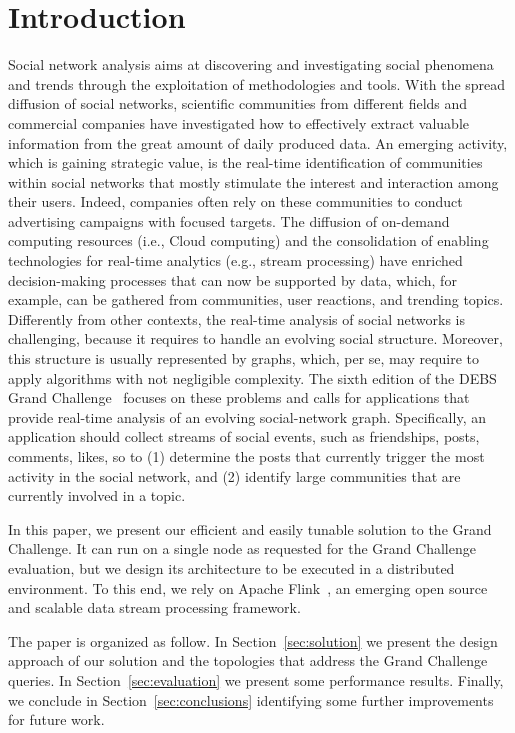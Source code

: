 \section{Introduction}
\label{sec:introduction}

Social network analysis aims at discovering and investigating social phenomena and trends through the exploitation of methodologies and tools.
With the spread diffusion of social networks, scientific communities from different fields and commercial companies have investigated how to effectively extract valuable information from the great amount of daily produced data. 
%
An emerging activity, which is gaining strategic value, is the real-time identification of communities within social networks that mostly stimulate the interest and interaction among their users. Indeed, companies often rely on these communities to conduct advertising campaigns with focused targets.
%
The diffusion of on-demand computing resources (i.e., Cloud computing) and the consolidation of enabling technologies for real-time analytics (e.g., stream processing) 
have enriched decision-making processes that can now be supported by data, which, for example, can be gathered from communities, user reactions, and trending topics.
%
Differently from other contexts, the real-time analysis of social networks is challenging, because it requires to handle an evolving social structure. Moreover, this structure is usually represented by graphs, which, per se, may require to apply algorithms with not negligible complexity.
%
The sixth edition of the DEBS Grand Challenge~\cite{GrandChallenge:2016} focuses on these problems and calls for applications that provide real-time analysis of an evolving social-network graph. Specifically, an application should collect streams of social events, such as friendships, posts, comments, likes, so to (1) determine the posts that currently trigger the most activity in the social network, and (2) identify large communities that are currently involved in a topic.

In this paper, we present our efficient and easily tunable solution to the Grand Challenge. 
It can run on a single node as requested for the  Grand Challenge evaluation, but we design its architecture to be executed in a distributed environment. 
To this end, we rely on Apache Flink~\cite{Flink}, an emerging open source and scalable data stream processing framework.

The paper is organized as follow. 
%
In Section~\ref{sec:solution} we present the design approach of our solution and the topologies that address the Grand Challenge queries.
%
In Section~\ref{sec:evaluation} we present some performance results. 
%
Finally, we conclude in Section~\ref{sec:conclusions} identifying some further improvements for future work. 
